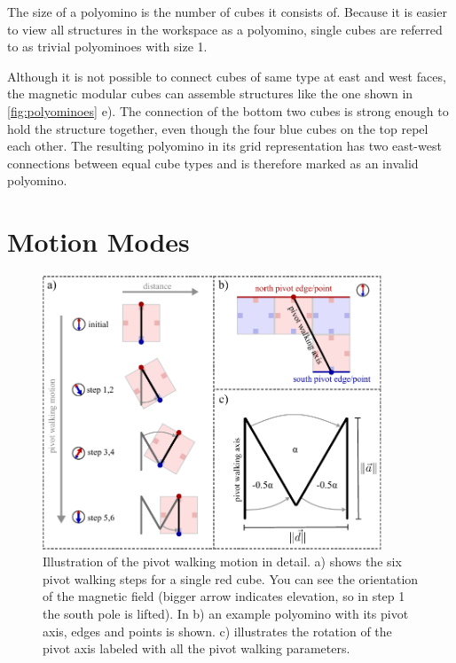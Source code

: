 The size of a polyomino is the number of cubes it consists of.
Because it is easier to view all structures in the workspace as a polyomino, single cubes are referred to as trivial polyominoes with size 1.

Although it is not possible to connect cubes of same type at east and west faces, the magnetic modular cubes can assemble structures like the one shown in \autoref{fig:polyominoes} e).
The connection of the bottom two cubes is strong enough to hold the structure together, even though the four blue cubes on the top repel each other.
The resulting polyomino in its grid representation has two east-west connections between equal cube types and is therefore marked as an invalid polyomino.



\section{Motion Modes}
\label{sec:motion}

\begin{figure}
	\centering
	\includegraphics[width=0.90\textwidth]{figures/pivot_walking.pdf}
	\caption[Illustration of the pivot walking motion]{Illustration of the pivot walking motion in detail. a) shows the six pivot walking steps for a single red cube. You can see the orientation of the magnetic field (bigger arrow indicates elevation, so in step 1 the south pole is lifted). In b) an example polyomino with its pivot axis, edges and points is shown. c) illustrates the rotation of the pivot axis labeled with all the pivot walking parameters.}
	\label{fig:pivot_walking}
\end{figure}

